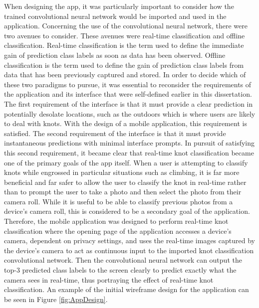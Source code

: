 \documentclass{l4proj}
\begin{document}
When designing the app, it was particularly important to consider how the trained convolutional neural network would be imported and used in the application.
Concerning the use of the convolutional neural network, there were two avenues to consider.
These avenues were real-time classification and offline classification.
Real-time classification is the term used to define the immediate gain of prediction class labels as soon as data has been observed.
Offline classification is the term used to define the gain of prediction class labels from data that has been previously captured and stored.
In order to decide which of these two paradigms to pursue, it was essential to reconsider the requirements of the application and its interface that were self-defined earlier in this dissertation.
The first requirement of the interface is that it must provide a clear prediction in potentially desolate locations, such as the outdoors which is where users are likely to deal with knots.
With the design of a mobile application, this requirement is satisfied.
The second requirement of the interface is that it must provide instantaneous predictions with minimal interface prompts. 
In pursuit of satisfying this second requirement, it became clear that real-time knot classification became one of the primary goals of the app itself.
When a user is attempting to classify knots while engrossed in particular situations such as climbing, it is far more beneficial and far safer to allow the user to classify the knot in real-time rather than to prompt the user to take a photo and then select the photo from their camera roll.
While it is useful to be able to classify previous photos from a device's camera roll, this is considered to be a secondary goal of the application.
Therefore, the mobile application was designed to perform real-time knot classification where the opening page of the application accesses a device's camera, dependent on privacy settings, and uses the real-time images captured by the device's camera to act as continuous input to the imported knot classification convolutional network. 
Then the convolutional neural network can output the top-3 predicted class labels to the screen clearly to predict exactly what the camera sees in real-time, thus portraying the effect of real-time knot classification.
An example of the initial wireframe design for the application can be seen in Figure \ref{fig:AppDesign}.
\end{document}
